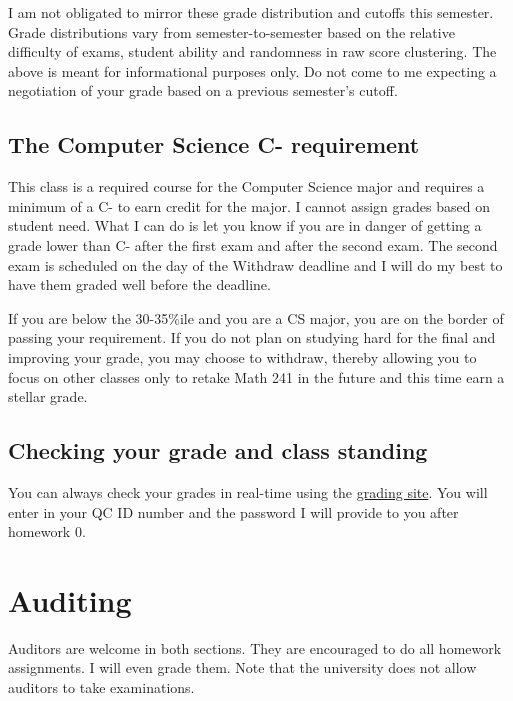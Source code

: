 \documentclass[12pt]{article}
\begin{document}
I am not obligated to mirror these grade distribution and cutoffs this semester. Grade distributions vary from semester-to-semester based on the relative difficulty of exams, student ability and randomness in raw score clustering. The above is meant for informational purposes only. Do not come to me expecting a negotiation of your grade based on a previous semester's cutoff.

\subsection*{The Computer Science C- requirement}

This class is a required course for the Computer Science major and requires a minimum of a C- to earn credit for the major. I cannot assign grades based on student need. What I can do is let you know if you are in danger of getting a grade lower than C- after the first exam and after the second exam. The second exam is scheduled on the day of the Withdraw deadline and I will do my best to have them graded well before the deadline. 

If you are below the 30-35\%ile and you are a CS major, you are on the border of passing your requirement. If you do not plan on studying hard for the final and improving your grade, you may choose to withdraw, thereby allowing you to focus on other classes only to retake Math 241 in the future and this time earn a stellar grade.

\subsection*{Checking your grade and class standing}

You can always check your grades in real-time using the \href{http://qcgrades.com}{grading site}. You will enter in your QC ID number and the password I will provide to you after homework 0.



\section*{Auditing}

Auditors are welcome in both sections. They are encouraged to do all homework assignments. I will even grade them. Note that the university does not allow auditors to take examinations.
\end{document}
